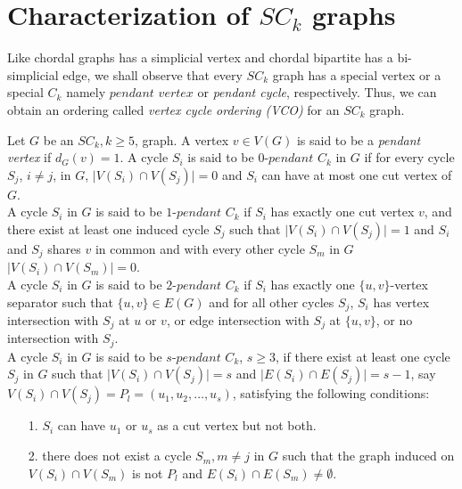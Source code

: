 \documentclass[runningheads]{llncs}
\begin{document}
\section{Characterization of $SC_k$ graphs}
Like chordal graphs has a simplicial vertex \cite{tarjan} and chordal bipartite \cite{GolumbicGoss} has a bi-simplicial edge, we shall observe that every $SC_k$ graph has a special vertex or a special $C_k$ namely $pendant$ $vertex$ or \emph{pendant cycle}, respectively. Thus, we can obtain an ordering called \emph{vertex cycle ordering (VCO)} for an $SC_k$ graph. 

\begin{definition}
Let $G$ be an $SC_k, k\geq 5$, graph. A vertex $v \in V(G)$ is said to be a \emph{pendant vertex} if $d_G(v) = 1$. A cycle $S_i$ is said to be $0$-$pendant$ $C_k$ in $G$ if for every cycle $S_j$, $i\neq j$, in $G$, $\vert V(S_i) \cap V(S_j) \vert = 0$ and $S_i$ can have at most one cut vertex of $G$.\\

 A cycle $S_i$ in $G$ is said to be $1$-$pendant$ $C_k$ if $S_i$ has exactly one cut vertex $v$, and there exist at least one induced cycle $S_j$ such that $\vert V(S_i) \cap V(S_j) \vert = 1$ and $S_i$ and $S_j$ shares $v$ in common and with every other cycle $S_m$ in $G$ $\vert V(S_i)\cap V(S_m)\vert = 0$. \\
 
 A cycle $S_i$ in $G$ is said to be $2$-$pendant$ $C_k$ if $S_i$ has exactly one $\{u,v\}$-vertex separator such that $\{u,v\} \in E(G)$ and for all other cycles $S_j$, $S_i$ has vertex intersection with $S_j$ at $u$ or $v$, or edge intersection with $S_j$ at $\{u,v\}$, or no intersection with $S_j$.\\

 A cycle $S_i$ in $G$ is said to be $s$-$pendant$ $C_k$, $s\geq 3$, if there exist at least one cycle $S_j$ in $G$ such that $\vert V(S_i) \cap V(S_j) \vert = s$ and $\vert E(S_i) \cap E(S_j) \vert = s-1$, say $V(S_i) \cap V(S_j) = P_l = (u_1,u_2,\ldots,u_s)$, satisfying the following conditions:
\begin{itemize}
\item[1.] $S_i$ can have $u_1$ or $u_s$ as a cut vertex but not both.
\item[2.] there does not exist a cycle $S_m, m \neq j$ in $G$ such that the graph induced on $ V(S_i)\cap V(S_m)$ is not $P_l$ and $ E(S_i)\cap E(S_m)  \neq \emptyset$.
\end{itemize}   
\end{definition}
\end{document}
